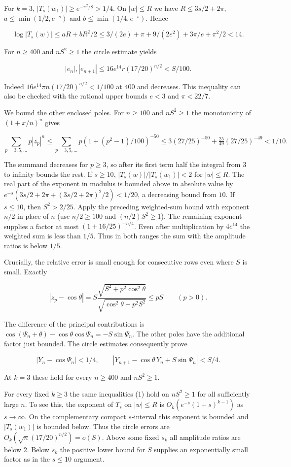 \documentclass[11pt]{article}
\begin{document}
For $k=3$, $|T_s(w_1)|\ge e^{-\pi^2/8}>1/4$. On $|w|\le R$ we have $R\le 3s/2+2\pi$, $a\le\min(1/2,e^{-s})$ and $b\le\min(1/4,e^{-s})$. Hence

\[
 \log |T_s(w)|\le aR+bR^2/2
 \le 3/(2e)+\pi+9/(2e^2)+3\pi/e+\pi^2/2<14 .
\]

For $n\ge400$ and $nS^2\ge1$ the circle estimate yields

\[
 |e_n|,|e_{n+1}|\le 16 e^{14} r(17/20)^{n/2}< S/100.
\]

Indeed $16 e^{14}\pi n(17/20)^{n/2}<1/100$ at $400$ and decreases. This inequality can also be checked with the rational upper bounds $e<3$ and $\pi<22/7$.

We bound the other enclosed poles. For $n\ge100$ and $nS^2\ge1$ the monotonicity of $(1+x/n)^n$ gives

\[
 \sum_{p=3,5,\ldots} p|z_p|^{n}\le
 \sum_{p=3,5,\ldots}p(1+(p^2-1)/100)^{-50}
 \le 3(27/25)^{-50}+\tfrac{25}{49}(27/25)^{-49}<1/10.
\]

The summand decreases for $p\ge3$, so after its first term half the integral from $3$ to infinity bounds the rest. If $s\ge10$, $|T_s(w)|/|T_s(w_1)|<2$ for $|w|\le R$. The real part of the exponent in modulus is bounded above in absolute value by $e^{-s}(3s/2+2\pi+(3s/2+2\pi)^2/2)<1/20$, a decreasing bound from $10$. If $s\le10$, then $S^2>2/25$. Apply the preceding weighted-sum bound with exponent $n/2$ in place of $n$ (use $n/2\ge100$ and $(n/2)S^2\ge1$). The remaining exponent supplies a factor at most $(1+16/25)^{-n/4}$. Even after multiplication by $4e^{14}$ the weighted sum is less than $1/5$. Thus in both ranges the sum with the amplitude ratios is below $1/5$.

Crucially, the relative error is small enough for consecutive rows even where $S$ is small. Exactly

\[
 |z_p-\cos\theta|=S\frac{\sqrt{S^2+p^2\cos^2\theta}}{\sqrt{\cos^2\theta+p^2S^2}}\le pS\qquad(p>0).
\]

The difference of the principal contributions is $\cos(\Psi_n+\theta)-\cos\theta\cos\Psi_n=-S\sin\Psi_n$. The other poles have the additional factor just bounded. The circle estimates consequently prove

\[
 |Y_n-\cos\Psi_n|<1/4,\qquad
 |Y_{n+1}-\cos\theta\,Y_n+S\sin\Psi_n|<S/4. \tag{1}
\]

At $k=3$ these hold for every $n\ge400$ and $nS^2\ge1$.

For every fixed $k\ge3$ the same inequalities (1) hold on $nS^2\ge1$ for all sufficiently large $n$. To see this, the exponent of $T_s$ on $|w|\le R$ is $O_k(e^{-s}(1+s)^{k-1})$ as $s\to\infty$. On the complementary compact $s$-interval this exponent is bounded and $|T_s(w_1)|$ is bounded below. Thus the circle errors are $O_k(\sqrt n(17/20)^{n/2})=o(S)$. Above some fixed $s_k$ all amplitude ratios are below 2. Below $s_k$ the positive lower bound for $S$ supplies an exponentially small factor as in the $s\le 10$ argument.
\end{document}
